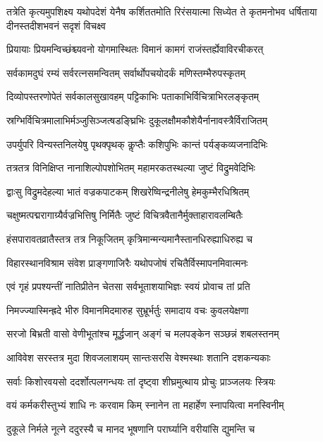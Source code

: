\fourlineindentedshloka
{तत्रेति कृत्यमुपशिक्ष्य यथोपदेशं}
{येनैष कर्शिततमोति रिरंसयात्मा}
{सिध्येत ते कृतमनोभव धर्षिताया}
{दीनस्तदीशभवनं सदृशं विचक्ष्व}%


\twolineshloka
{प्रियायाः प्रियमन्विच्छंश्च्यवनो योगमास्थितः}
{विमानं कामगं राजंस्तर्ह्येवाविरचीकरत्}%

\twolineshloka
{सर्वकामदुघं रम्यं सर्वरत्नसमन्वितम्}
{सर्वार्थोपचयोदर्कं मणिस्तम्भैरुपस्कृतम्}%

\twolineshloka
{दिव्योपस्तरणोपेतं सर्वकालसुखावहम्}
{पट्टिकाभिः पताकाभिर्विचित्राभिरलङ्कृतम्}%

\twolineshloka
{स्रग्भिर्विचित्रमालाभिर्मञ्जुसिञ्जत्षडङ्घ्रिभिः}
{दुकूलक्षौमकौशेयैर्नानावस्त्रैर्विराजितम्}%

\twolineshloka
{उपर्युपरि विन्यस्तनिलयेषु पृथक्पृथक्}
{कॢप्तैः कशिपुभिः कान्तं पर्यङ्कव्यजनादिभिः}%

\twolineshloka
{तत्रतत्र विनिक्षिप्त नानाशिल्पोपशोभितम्}
{महामरकतस्थल्या जुष्टं विद्रुमवेदिभिः}%

\twolineshloka
{द्वाःसु विद्रुमदेहल्या भातं वज्रकपाटकम्}
{शिखरेष्विन्द्रनीलेषु हेमकुम्भैरधिश्रितम्}%

\twolineshloka
{चक्षुष्मत्पद्मरागाग्र्यैर्वज्रभित्तिषु निर्मितैः}
{जुष्टं विचित्रवैतानैर्मुक्ताहारावलम्बितैः}%

\twolineshloka
{हंसपारावतव्रातैस्तत्र तत्र निकूजितम्}
{कृत्रिमान्मन्यमानैस्तानधिरुह्याधिरुह्य च}%

\twolineshloka
{विहारस्थानविश्राम संवेश प्राङ्गणाजिरैः}
{यथोपजोषं रचितैर्विस्मापनमिवात्मनः}%

\twolineshloka
{एवं गृहं प्रपश्यन्तीं नातिप्रीतेन चेतसा}
{सर्वभूताशयाभिज्ञः स्वयं प्रोवाच तां प्रति}%

\twolineshloka
{निमज्ज्यास्मिन्ह्रदे भीरु विमानमिदमारुह}
{सुभ्रूर्भर्तुः समादाय वचः कुवलयेक्षणा}%

\twolineshloka
{सरजो बिभ्रती वासो वेणीभूतांश्च मूर्द्धजान्}
{अङ्गं च मलपङ्केन सञ्छन्नं शबलस्तनम्}%

\twolineshloka
{आविवेश सरस्तत्र मुदा शिवजलाशयम्}
{सान्तःसरसि वेश्मस्थाः शतानि दशकन्यकाः}%

\twolineshloka
{सर्वाः किशोरवयसो ददर्शोत्पलगन्धयः}
{तां दृष्ट्वा शीघ्रमुत्थाय प्रोचुः प्राञ्जलयः स्त्रियः}%

\twolineshloka
{वयं कर्मकरीस्तुभ्यं शाधि नः करवाम किम्}
{स्नानेन ता महार्हेण स्नापयित्वा मनस्विनीम्}%

\twolineshloka
{दुकूले निर्मले नूत्ने ददुरस्यै च मानद}
{भूषणानि परार्घ्यानि वरीयांसि द्युमन्ति च}%

